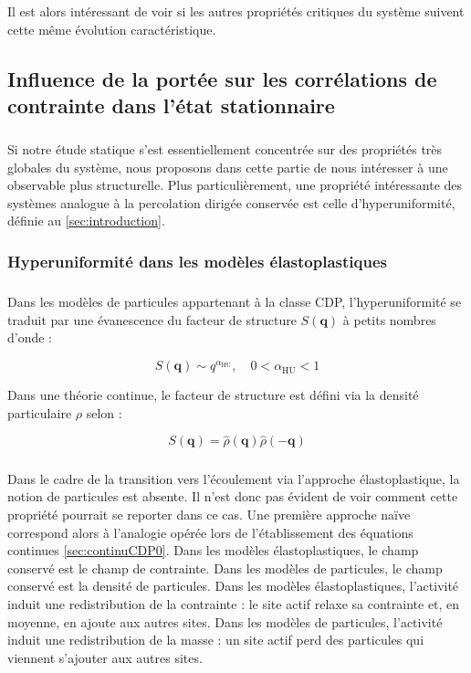 \subparagraph{}Il est alors intéressant de voir si les autres propriétés critiques du système suivent cette même évolution caractéristique.

\subsection{Influence de la portée sur les corrélations de contrainte dans l'état stationnaire}

\subparagraph{}Si notre étude statique s'est essentiellement concentrée sur des propriétés très globales du système, nous proposons dans cette partie de nous intéresser à une observable plus structurelle. Plus particulièrement, une propriété intéressante des systèmes analogue à la percolation dirigée conservée est celle d'hyperuniformité, définie au \autoref{sec:introduction}.

\subsubsection{Hyperuniformité dans les modèles élastoplastiques}

\subparagraph{}Dans les modèles de particules appartenant à la classe CDP, l'hyperuniformité se traduit par une évanescence du facteur de structure $S(\mathbf{q})$ à petits nombres d'onde :

\begin{equation}
	S(\mathbf{q})\sim q^{\alpha_\text{HU}}, \quad 0<\alpha_\text{HU}<1
\end{equation}

\noindent Dans une théorie continue, le facteur de structure est défini via la densité particulaire $\rho$ selon :

\begin{equation}
	S(\mathbf{q}) =  \hat{\rho}(\mathbf{q})\hat{\rho}(\mathbf{-q})
\end{equation}

\subparagraph{}Dans le cadre de la transition vers l'écoulement via l'approche élastoplastique, la notion de particules est absente. Il n'est donc pas évident de voir comment cette propriété pourrait se reporter dans ce cas. Une première approche naïve correspond alors à l'analogie opérée lors de l'établissement des équations continues \autoref{sec:continuCDP0}. Dans les modèles élastoplastiques, le champ conservé est le champ de contrainte. Dans les modèles de particules, le champ conservé est la densité de particules. Dans les modèles élastoplastiques, l'activité induit une redistribution de la contrainte : le site actif relaxe sa contrainte et, en moyenne, en ajoute aux autres sites. Dans les modèles de particules, l'activité induit une redistribution de la masse : un site actif perd des particules qui viennent s'ajouter aux autres sites.

